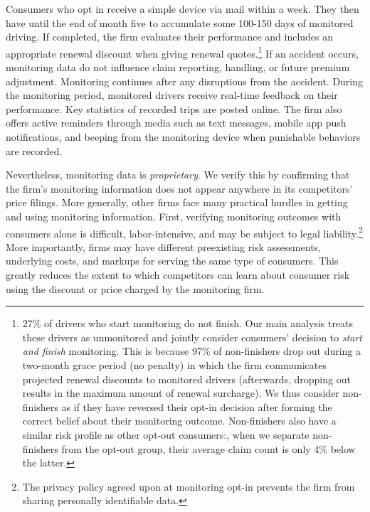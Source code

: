 Consumers who opt in receive a simple device via mail within a week. They then have until the end of month five to accumulate some 100-150 days of monitored driving. If completed, the firm evaluates their performance and includes an appropriate renewal discount when giving renewal quotes.\footnote{27\% of drivers who start monitoring do not finish. Our main analysis treats these drivers as unmonitored and jointly consider consumers' decision to \textit{start and finish} monitoring. This is because 97\% of non-finishers drop out during a two-month grace period (no penalty) in which the firm communicates projected renewal discounts to monitored drivers (afterwards, dropping out results in the maximum amount of renewal surcharge). We thus consider non-finishers as if they have reversed their opt-in decision after forming the correct belief about their monitoring outcome. Non-finishers also have a similar risk profile as other opt-out consumers:, when we separate non-finishers from the opt-out group, their average claim count is only 4\% below the latter.
}
If an accident occurs, monitoring data do not influence claim reporting, handling, or future premium adjustment. Monitoring continues after any disruptions from the accident.
During the monitoring period, monitored drivers receive real-time feedback on their performance. Key statistics of recorded trips are posted online. The firm also offers active reminders through media such as text messages, mobile app push notifications, and beeping from the monitoring device when punishable behaviors are recorded.

Nevertheless, monitoring data is \emph{proprietary}. We verify this by confirming that the firm's monitoring information does not appear anywhere in its competitors' price filings. More generally, other firms face many practical hurdles in getting and using monitoring information. First, verifying monitoring outcomes with consumers alone is difficult, labor-intensive, and may be subject to legal liability.\footnote{The privacy policy agreed upon at monitoring opt-in prevents the firm from sharing personally identifiable data.} More importantly, firms may have different preexisting risk assessments, underlying costs, and markups for serving the same type of consumers. This greatly reduces the extent to which competitors can learn about consumer risk using the discount or price charged by the monitoring firm.

